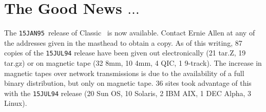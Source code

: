 

\newcommand{\AMark}{AIPSMark$^{(93)}$}
\newcommand{\AMarks}{AIPSMarks$^{(93)}$}
\newcommand{\LMark}{AIPSLoopMark$^{(93)}$}
\newcommand{\LMarks}{AIPSLoopMarks$^{(93)}$}
\newcommand{\AM}{A_m^{(93)}}
\newcommand{\ALM}{AL_m^{(93)}}

\newcommand{\AIPRELEASE}{January 15, 1995}
\newcommand{\AIPVOLUME}{Volume XV}
\newcommand{\AIPNUMBER}{Number 1}
\newcommand{\RELEASENAME}{{\tt 15JAN95}}




\newcommand{\MYSpace}{-11pt}

\normalstyle

\section{The Good News $\ldots$}

The \RELEASENAME\ release of Classic \AIPS\ is now available.  Contact
Ernie Allen at any of the addresses given in the masthead to obtain a
copy.  As of this writing, 87 copies of the {\tt 15JUL94} release
have been given out electronically (21 tar.Z, 19 tar.gz) or on
magnetic tape (32 8mm, 10 4mm, 4 QIC, 1 9-track).  The increase in
magnetic tapes over network transmissions is due to the availability
of a full binary distribution, but only on magnetic tape.  36 sites
took advantage of this with the {\tt 15JUL94} release (20 Sun OS, 10
Solaris, 2 IBM AIX, 1 DEC Alpha, 3 Linux).

